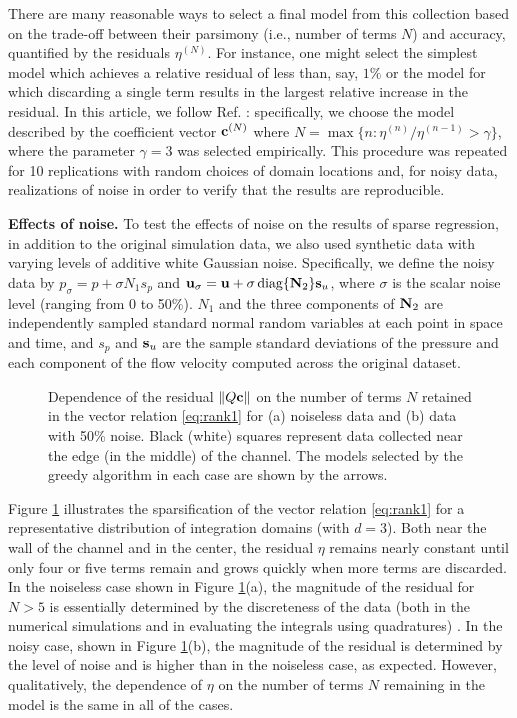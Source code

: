 \documentclass[
 reprint,
 amsmath,amssymb,
 aps,
]{revtex4-2}
\begin{document}
There are many reasonable ways to select a final model from this collection based on the trade-off between their parsimony (i.e., number of terms $N$) and accuracy, quantified by the residuals $\eta^{(N)}$. For instance, one might select the simplest model which achieves a relative residual of less than, say, $1\%$ or the model for which discarding a single term results in the largest relative increase in the residual. In this article, we follow Ref. \cite{gurevich2019}: specifically, we choose the model described by the coefficient vector ${\bf c}^{(N)}$ where $N = \max\{n : \eta^{(n)}/\eta^{(n-1)} > \gamma\}$, where the parameter $\gamma = 3$ was selected empirically. This procedure was repeated for 10 replications with random choices of domain locations and, for noisy data, realizations of noise in order to verify that the results are reproducible. 

{\bf Effects of noise.} To test the effects of noise on the results of sparse regression, in addition to the original simulation data, we also used synthetic data with varying levels of additive white Gaussian noise. Specifically, we define the noisy data by $p_{\sigma} = p + \sigma N_1 s_p$ and ${\bf u}_{\sigma} = {\bf u} + \sigma\,\text{diag}\{{\bf N}_2\}{\bf s}_u$, where $\sigma$ is the scalar noise level (ranging from 0 to 50\%). $N_1$ and the three components of ${\bf N}_2$ are independently sampled standard normal random variables at each point in space and time, and $s_p$ and ${\bf s}_u$ are the sample standard deviations of the pressure and each component of the flow velocity computed across the original dataset.

\begin{figure*}[t]
\centering
{}
\hfill
{}
\caption{Dependence of the residual $\|Q{\bf c}\|$ on the number of terms $N$ retained in the vector relation \eqref{eq:rank1} for (a) noiseless data and (b) data with 50\% noise. Black (white) squares represent data collected near the edge (in the middle) of the channel. The models selected by the greedy algorithm in each case are shown by the arrows.
}
\label{fig:pareto}
\end{figure*}

Figure \ref{fig:pareto} illustrates the sparsification of the vector relation \eqref{eq:rank1} for a representative distribution of integration domains (with $d=3$). Both near the wall of the channel and in the center, the residual $\eta$ remains nearly constant until only four or five terms remain and grows quickly when more terms are discarded. In the noiseless case shown in Figure \ref{fig:pareto}(a), the magnitude of the residual for $N>5$ is essentially determined by the discreteness of the data (both in the numerical simulations and in evaluating the integrals using quadratures) \cite{gurevich2019}. In the noisy case, shown in Figure \ref{fig:pareto}(b), the magnitude of the residual is determined by the level of  noise and is higher than in the noiseless case, as expected. However, qualitatively, the dependence of $\eta$ on the number of terms $N$ remaining in the model is the same in all of the cases.
\end{document}
